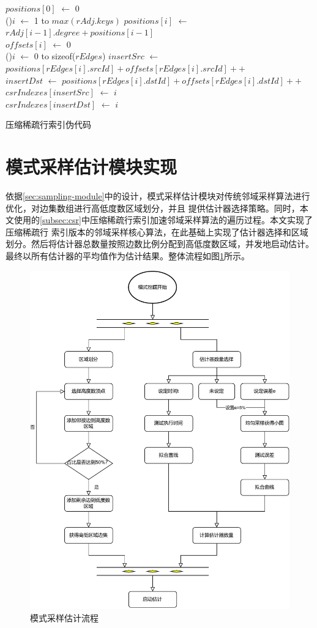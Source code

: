 \documentclass[master]{thesis-uestc}
\begin{document}
\begin{algorithm}[H]
    $positions[0]$ $\leftarrow$ 0\\
    \For(){$i$ $\leftarrow$ 1 to $max(rAdj.keys)$}{
        $positions[i]$ $\leftarrow$ $rAdj[i-1].degree + positions[i-1]$\\
        $offsets[i]$ $\leftarrow$ 0\\
    }
    \For(){$i$ $\leftarrow$ 0 to sizeof($rEdges$)}{
        $insertSrc$ $\leftarrow$ $positions[rEdges[i].srcId] + offsets[rEdges[i].srcId]++$\\
        $insertDst$ $\leftarrow$ $positions[rEdges[i].dstId] + offsets[rEdges[i].dstId]++$\\
        $csrIndexes[insertSrc]$ $\leftarrow$ $i$\\
        $csrIndexes[insertDst]$ $\leftarrow$ $i$\\
    }
    \caption{压缩稀疏行索引伪代码}
    \label{alg:csr}
\end{algorithm}

\section{模式采样估计模块实现}
\label{sec:sampling-impl}
    依据\ref{sec:sampling-module}中的设计，模式采样估计模块对传统邻域采样算法进行优化，对边集数组进行高低度数区域划分，并且
提供估计器选择策略。同时，本文使用的\ref{subsec:csr}中压缩稀疏行索引加速邻域采样算法的遍历过程。本文实现了压缩稀疏行
索引版本的邻域采样核心算法，在此基础上实现了估计器选择和区域划分。然后将估计器总数量按照边数比例分配到高低度数区域，并发地启动估计。
最终以所有估计器的平均值作为估计结果。整体流程如图\ref{fig:sample-flow}所示。
\begin{figure}
    \centering
    \includegraphics[width=.7\linewidth]{pic/sample_flow.pdf}
    \caption{模式采样估计流程}
    \label{fig:sample-flow}
\end{figure}
\end{document}
